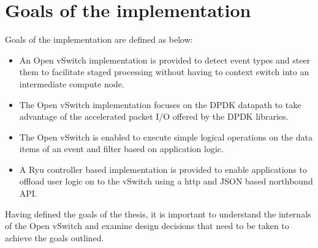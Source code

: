 \section{Goals of the implementation}
Goals of the implementation are defined as below:
\begin{itemize}
\item An Open vSwitch implementation is provided to detect event types and steer them to facilitate staged processing without having to context switch into an intermediate compute node.
\item The Open vSwitch implementation focuses on the DPDK datapath to take advantage of the accelerated packet I/O offered by the DPDK libraries.
\item The Open vSwitch is enabled to execute simple logical operations on the data items of an event and filter based on application logic. 
\item A Ryu controller based implementation is provided to enable applications to offload user logic on to the vSwitch using a http and JSON based northbound API.
\end{itemize}
Having defined the goals of the thesis, it is important to understand the internals of the Open vSwitch and examine design decisions that need to be taken to achieve the goals outlined.

